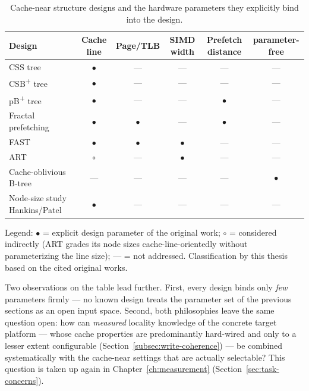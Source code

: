 \begin{nurlang}
\begin{table}[!htbp]
  \caption{Cache-near structure designs and the hardware parameters they explicitly bind into the
  design.}\label{tab:structure-parameters}
  \centering\footnotesize
  \setlength{\tabcolsep}{4pt}%
  \begin{tabular}{@{}l c c c c c@{}}
    \toprule
    \textbf{Design} & \textbf{Cache line} & \textbf{Page/TLB} & \textbf{SIMD width} &
    \textbf{Prefetch distance} & \textbf{parameter-free} \\
    \midrule
    CSS tree~\cite{rao1999css}                         & $\bullet$ & ---       & ---       & ---       & --- \\
    CSB\textsuperscript{+} tree~\cite{rao2000csb}      & $\bullet$ & ---       & ---       & ---       & --- \\
    pB\textsuperscript{+} tree~\cite{chen2001prefetch} & $\bullet$ & ---       & ---       & $\bullet$ & --- \\
    Fractal prefetching~\cite{chen2002fractal}         & $\bullet$ & $\bullet$ & ---       & $\bullet$ & --- \\
    FAST~\cite{kim2010fast}                            & $\bullet$ & $\bullet$ & $\bullet$ & ---       & --- \\
    ART~\cite{leis2013art}                             & $\circ$   & ---       & $\bullet$ & ---       & --- \\
    Cache-oblivious B-tree~\cite{bender2005coboblivious} & ---     & ---       & ---       & ---       & $\bullet$ \\
    Node-size study Hankins/Patel~\cite{hankins2003nodesize} & $\bullet$ & --- & ---       & ---       & --- \\
    \bottomrule
  \end{tabular}
  \par\medskip\footnotesize
  Legend: $\bullet$ = explicit design parameter of the original work; $\circ$ = considered
  indirectly (ART grades its node sizes cache-line-orientedly without parameterizing the line
  size); --- = not addressed. Classification by this thesis based on the cited original works.
\end{table}

Two observations on the table lead further. First, every design binds only \emph{few}
parameters firmly --- no known design treats the parameter set of the previous sections as an open
input space. Second, both philosophies leave the same question open: how can \emph{measured}
locality knowledge of the concrete target platform --- whose cache properties are predominantly
hard-wired and only to a lesser extent configurable (Section~\ref{subsec:write-coherence}) --- be
combined systematically with the cache-near settings that are actually selectable? This question is
taken up again in Chapter~\ref{ch:measurement} (Section~\ref{sec:task-concerns}).
\end{nurlang}
